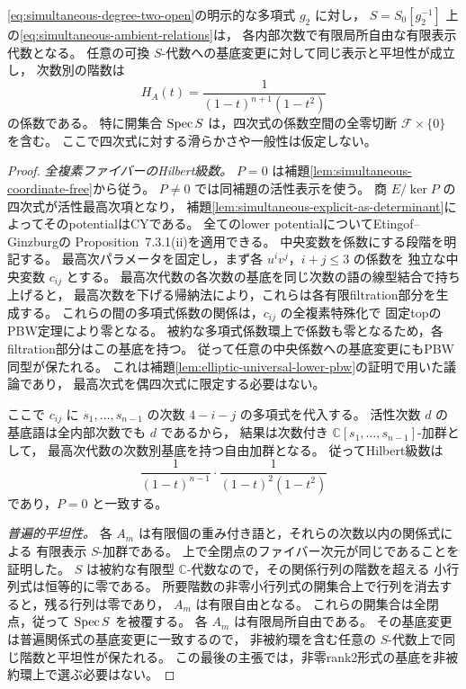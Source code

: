 \begin{theorem}
\label{thm:simultaneous-poisson-ambient}
\eqref{eq:simultaneous-degree-two-open}の明示的な多項式 $g_2$ に対し，
$S=S_0[g_2^{-1}]$ 上の\eqref{eq:simultaneous-ambient-relations}は，
各内部次数で有限局所自由な有限表示代数となる。
任意の可換 $S$-代数への基底変更に対して同じ表示と平坦性が成立し，
次数別の階数は
\[
 H_A(t)=\frac1{(1-t)^{n+1}(1-t^2)}
\]
の係数である。
特に開集合 $\operatorname{Spec} S$ は，四次式の係数空間の全零切断
$\mathcal F\times\{0\}$ を含む。
ここで四次式に対する滑らかさや一般性は仮定しない。
\end{theorem}
\begin{proof}
\emph{全複素ファイバーのHilbert級数。}
$P=0$ は補題\ref{lem:simultaneous-coordinate-free}から従う。
$P\ne0$ では同補題の活性表示を使う。
商 $E/\ker P$ の四次式が活性最高次項となり，
補題\ref{lem:simultaneous-explicit-as-determinant}によってそのpotentialはCYである。
全てのlower potentialについてEtingof--Ginzburgの
Proposition~7.3.1(ii)\cite{EG2010}を適用できる。
中央変数を係数にする段階を明記する。
最高次パラメータを固定し，まず各 $u^iv^j$，$i+j\le3$ の係数を
独立な中央変数 $c_{ij}$ とする。
最高次代数の各次数の基底を同じ次数の語の線型結合で持ち上げると，
最高次数を下げる帰納法により，これらは各有限filtration部分を生成する。
これらの間の多項式係数の関係は，$c_{ij}$ の全複素特殊化で
固定topのPBW定理により零となる。
被約な多項式係数環上で係数も零となるため，各filtration部分はこの基底を持つ。
従って任意の中央係数への基底変更にもPBW同型が保たれる。
これは補題\ref{lem:elliptic-universal-lower-pbw}の証明で用いた議論であり，
最高次式を偶四次式に限定する必要はない。

ここで $c_{ij}$ に $s_1,\ldots,s_{n-1}$ の次数 $4-i-j$ の多項式を代入する。
活性次数 $d$ の基底語は全内部次数でも $d$ であるから，
結果は次数付き $\mathbb C[s_1,\ldots,s_{n-1}]$-加群として，
最高次代数の次数別基底を持つ自由加群となる。
従ってHilbert級数は
\[
 \frac1{(1-t)^{n-1}}\cdot\frac1{(1-t)^2(1-t^2)}
\]
であり，$P=0$ と一致する。

\emph{普遍的平坦性。}
各 $A_m$ は有限個の重み付き語と，それらの次数以内の関係式による
有限表示 $S$-加群である。
上で全閉点のファイバー次元が同じであることを証明した。
$S$ は被約な有限型 $\mathbb C$-代数なので，その関係行列の階数を超える
小行列式は恒等的に零である。
所要階数の非零小行列式の開集合上で行列を消去すると，残る行列は零であり，
$A_m$ は有限自由となる。
これらの開集合は全閉点，従って $\operatorname{Spec} S$ を被覆する。
各 $A_m$ は有限局所自由である。
その基底変更は普遍関係式の基底変更に一致するので，
非被約環を含む任意の $S$-代数上で同じ階数と平坦性が保たれる。
この最後の主張では，非零rank2形式の基底を非被約環上で選ぶ必要はない。
\end{proof}

